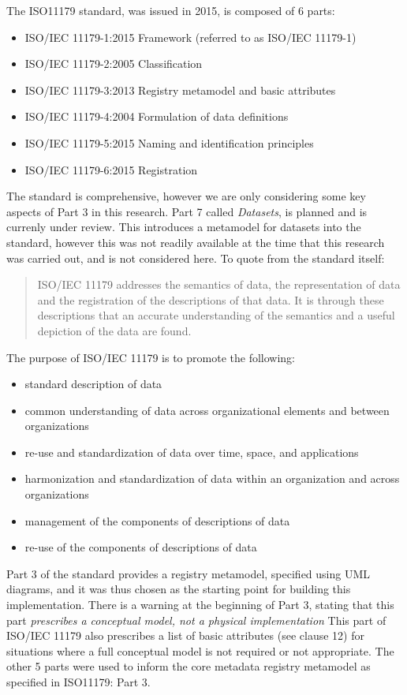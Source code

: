 \documentclass[runningheads]{llncs}
\begin{document}
	The ISO11179 \cite{ISO11179} standard, was issued in 2015, is composed of 6 parts:
	\begin{itemize}
		\item ISO/IEC 11179-1:2015 Framework (referred to as ISO/IEC 11179-1)
		\item ISO/IEC 11179-2:2005 Classification
		\item ISO/IEC 11179-3:2013 Registry metamodel and basic attributes
		\item ISO/IEC 11179-4:2004 Formulation of data definitions
		\item ISO/IEC 11179-5:2015 Naming and identification principles
		\item ISO/IEC 11179-6:2015 Registration	
	\end{itemize}
	The standard is comprehensive, however we are only considering some key aspects of Part 3 in this research. Part 7 called \emph{Datasets}, is planned and is currenly under review. This introduces a metamodel for datasets into the standard, however this was not readily available at the time that this research was carried out, and is not considered here. To quote from the standard itself:
	\begin{quote}
		ISO/IEC 11179 addresses the semantics of data, the representation of data and the registration of the descriptions of that data. It is through these descriptions that an accurate understanding of the semantics and a useful depiction of the data are found. 
	\end{quote}
	The purpose of ISO/IEC 11179 is to promote the following:
	\begin{itemize}
		\item standard description of data
		\item common understanding of data across organizational elements and between organizations
		\item re-use and standardization of data over time, space, and applications
		\item harmonization and standardization of data within an organization and across organizations
		\item management of the components of descriptions of data
		\item re-use of the components of descriptions of data
	\end{itemize}
	
	Part 3 of the standard provides a registry metamodel, specified using UML diagrams, and it was thus chosen as the starting point for building this implementation. There is a warning at the beginning of Part 3, stating that this part \emph{ prescribes a conceptual model, not a physical implementation } This part of ISO/IEC 11179 also prescribes a list of basic attributes (see clause 12) for situations where a full conceptual model is not required or not appropriate. The other 5 parts were used to inform the core metadata registry metamodel as specified in ISO11179: Part 3.
	
\end{document}
